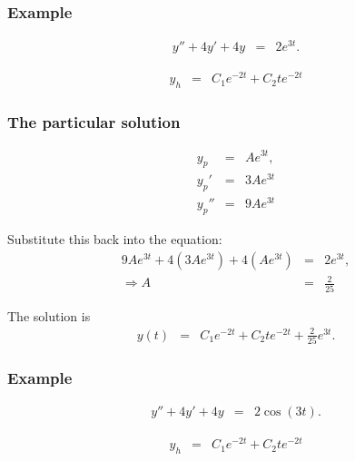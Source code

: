 \begin{frame}
  \frametitle{Example}

  \begin{eqnarray*}
    y'' + 4y' + 4y & = & 2 e^{3t}.
  \end{eqnarray*}

  {
    \begin{eqnarray*}
      y_h & = & C_1 e^{-2t} + C_2 t e^{-2t}
    \end{eqnarray*}
  }

\end{frame}


\begin{frame}
  \frametitle{The particular solution}

  \begin{eqnarray*}
    y_p & = & A e^{3t}, \\
    y_p' & = & 3 A e^{3t} \\
    y_p'' & = & 9 A e^{3t}
  \end{eqnarray*}

  Substitute this back into the equation:
  \begin{eqnarray*}
    9 A e^{3t} + 4 (3 A e^{3t}) + 4 (A e^{3t}) & = & 2 e^{3t}, \\
    \Rightarrow 
    A & = & \frac{2}{25}
  \end{eqnarray*}

  The solution is 
  \begin{eqnarray*}
    y(t) & = & C_1 e^{-2t} + C_2 t e^{-2t} + \frac{2}{25} e^{3t}.
  \end{eqnarray*}

\end{frame}



\begin{frame}
  \frametitle{Example}

  \begin{eqnarray*}
    y'' + 4y' + 4y & = & 2 \cos(3t).
  \end{eqnarray*}

  {
    \begin{eqnarray*}
      y_h & = & C_1 e^{-2t} + C_2 t e^{-2t}
    \end{eqnarray*}
  }

\end{frame}


